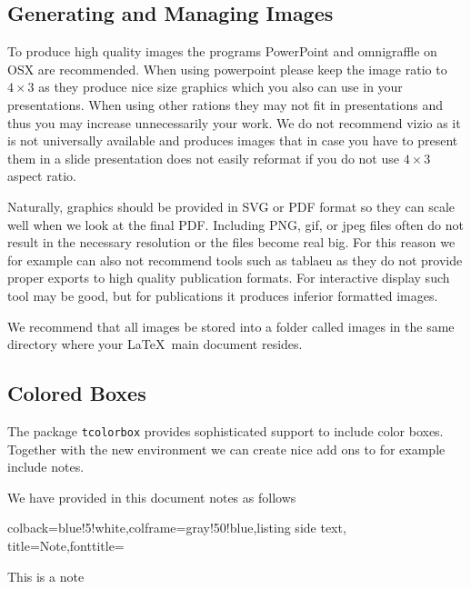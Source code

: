 \subsection{Generating and Managing Images}\label{generating-images}

To produce high quality images the programs PowerPoint and omnigraffle
on OSX are recommended. When using powerpoint please keep the image
ratio to $4\times 3$ as they produce nice size graphics which you also can use
in your presentations. When using other rations they may not fit in
presentations and thus you may increase unnecessarily your work. We do
not recommend vizio as it is not universally available and produces
images that in case you have to present them in a slide presentation
does not easily reformat if you do not use $4\times 3$ aspect ratio.

Naturally, graphics should be provided in SVG or PDF format so they can
scale well when we look at the final PDF. Including PNG, gif, or jpeg
files often do not result in the necessary resolution or the files
become real big. For this reason we for example can also not recommend
tools such as tablaeu as they do not provide proper exports to high
quality publication formats. For interactive display such tool may be
good, but for publications it produces inferior formatted images.

We recommend that all images be stored into a folder called images in
the same directory where your \LaTeX~main document resides.



\subsection{Colored Boxes}

The package \verb|tcolorbox| provides sophisticated support to include
color boxes. Together with the new environment we can create nice add
ons to for example include notes.


We have provided in this document notes as follows


\begin{tcblisting}{colback=blue!5!white,colframe=gray!50!blue,listing side text,  title=Note,fonttitle=\bfseries}
\begin{NOTE}
This is a note
\end{NOTE}
\end{tcblisting}

